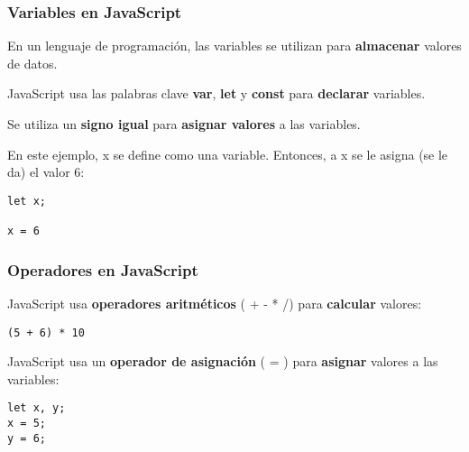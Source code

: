 \begin{frame}[fragile]
  \frametitle{Variables en JavaScript}

  En un lenguaje de programación, las variables se utilizan
  para \textbf{almacenar} valores de datos.

  \vspace{\baselineskip}
  JavaScript usa las palabras clave \textbf{var}, \textbf{let} y
  \textbf{const} para \textbf{declarar} variables.

  \vspace{\baselineskip}
  Se utiliza un \textbf{signo igual} para \textbf{asignar valores}
  a las variables.

  \vspace{\baselineskip}
  En este ejemplo, x se define como una variable.
  Entonces, a x se le asigna (se le da) el valor 6:

  \vspace{\baselineskip}
  \begin{lstlisting}
let x;

x = 6
  \end{lstlisting}
\end{frame}


\begin{frame}[fragile]
  \frametitle{Operadores en JavaScript}

  JavaScript usa \textbf{operadores aritméticos} ( + - * /) para
  \textbf{calcular} valores:

  \vspace{\baselineskip}
  \begin{lstlisting}
(5 + 6) * 10
  \end{lstlisting}

  \vspace{\baselineskip}
  JavaScript usa un \textbf{operador de asignación} ( = )
  para \textbf{asignar} valores a las variables:

  \vspace{\baselineskip}
  \begin{lstlisting}
let x, y;
x = 5;
y = 6;
  \end{lstlisting}
\end{frame}

